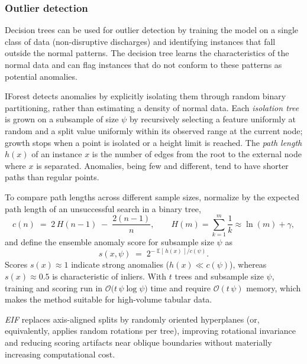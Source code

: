 \subsubsection{Outlier detection}

Decision trees can be used for outlier detection by training the model on a single class of data (non-disruptive discharges) and identifying instances that fall outside the normal patterns. The decision tree learns the characteristics of the normal data and can flag instances that do not conform to these patterns as potential anomalies. 

\ac{IForest} detects anomalies by explicitly isolating them through random binary partitioning, rather than estimating a density of normal data. Each \emph{isolation tree} is grown on a subsample of size $\psi$ by recursively selecting a feature uniformly at random and a split value uniformly within its observed range at the current node; growth stops when a point is isolated or a height limit is reached. The \emph{path length} $h(x)$ of an instance $x$ is the number of edges from the root to the external node where $x$ is separated. Anomalies, being few and different, tend to have shorter paths than regular points.\autocite{inproceedings}

To compare path lengths across different sample sizes, \textcite{inproceedings} normalize by the expected path length of an unsuccessful search in a binary tree,
\begin{equation}
c(n)\;=\;2\,H(n-1)\;-\;\frac{2(n-1)}{n},
\qquad
H(m)=\sum_{k=1}^{m}\frac{1}{k}\approx \ln(m)+\gamma,
\label{eq:expected-path-length}
\end{equation}
and define the ensemble anomaly score for subsample size $\psi$ as
\begin{equation}
s(x,\psi)\;=\;2^{-\; \mathbb{E}[\,h(x)\,]/c(\psi)}.
\label{eq:isolation-forest-score}
\end{equation}
Scores $s(x)\approx 1$ indicate strong anomalies ($h(x)\ll c(\psi)$), whereas $s(x)\approx 0.5$ is characteristic of inliers. With $t$ trees and subsample size $\psi$, training and scoring run in $\mathcal{O}\big(t\,\psi\log\psi\big)$ time and require $\mathcal{O}(t\,\psi)$ memory, which makes the method suitable for high-volume tabular data.\autocite{inproceedings}

\emph{\ac{EIF}} replaces axis-aligned splits by randomly oriented hyperplanes (or, equivalently, applies random rotations per tree), improving rotational invariance and reducing scoring artifacts near oblique boundaries without materially increasing computational cost.\autocite{haririExtendedIsolationForest2019}

